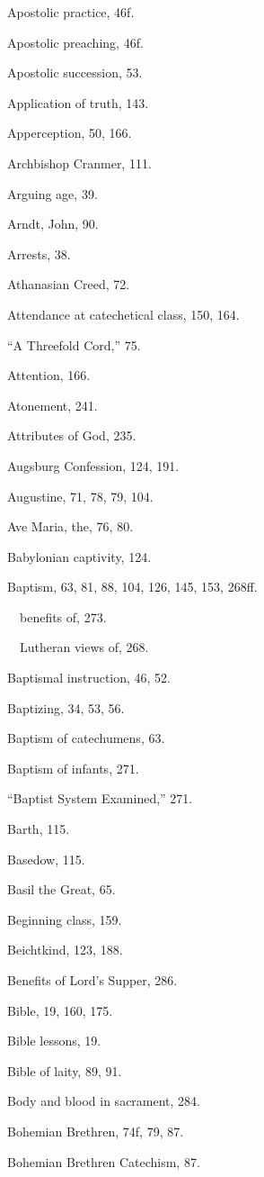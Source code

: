 \begin{originalinhalt}
Apostolic practice, 46f.

Apostolic preaching, 46f.

Apostolic succession, 53.

Application of truth, 143.

Apperception, 50, 166.

Archbishop Cranmer, 111.

Arguing age, 39.

Arndt, John, 90.

Arrests, 38.

Athanasian Creed, 72.

Attendance at catechetical class, 150, 164.

“A Threefold Cord,” 75.

Attention, 166.

Atonement, 241.

Attributes of God, 235.

Augsburg Confession, 124, 191.

Augustine, 71, 78, 79, 104.

Ave Maria, the, 76, 80.

Babylonian captivity, 124.

Baptism, 63, 81, 88, 104, 126, 145, 153, 268ff.

 benefits of, 273.

 Lutheran views of, 268.

Baptismal instruction, 46, 52.

Baptizing, 34, 53, 56.

Baptism of catechumens, 63.

Baptism of infants, 271.

“Baptist System Examined,” 271.

Barth, 115.

Basedow, 115.

Basil the Great, 65.

Beginning class, 159.

Beichtkind, 123, 188.

Benefits of Lord’s Supper, 286.

Bible, 19, 160, 175.

Bible lessons, 19.

Bible of laity, 89, 91.

Body and blood in sacrament, 284.

Bohemian Brethren, 74f, 79, 87.

Bohemian Brethren Catechism, 87.


\end{originalinhalt}
